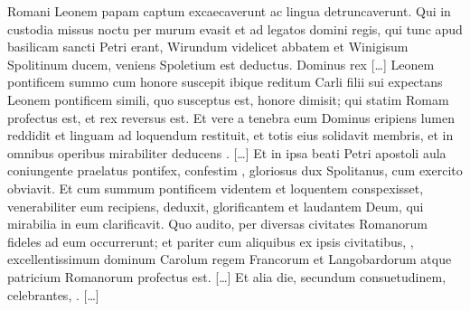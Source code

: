 \documentclass[12pt]{article}
\begin{document}
{		\beginnumbering
		\pstart
		 Romani Leonem papam  captum excaecaverunt ac lingua detruncaverunt. Qui in custodia missus noctu per murum evasit et ad legatos domini regis, qui tunc apud basilicam sancti Petri erant, Wirundum videlicet abbatem et Winigisum Spolitinum ducem, veniens Spoletium est deductus. Dominus rex [\dots]  Leonem pontificem summo cum honore suscepit ibique reditum Carli filii sui expectans Leonem pontificem simili, quo susceptus est, honore dimisit; qui statim Romam profectus est, et rex  reversus est.
		\pend
		\vskip 12pt
		\pstart
		 Et vere a tenebra eum Dominus eripiens lumen reddidit et linguam ad loquendum restituit, et totis eius solidavit membris, et in omnibus operibus mirabiliter deducens . [\dots] Et in ipsa beati Petri apostoli aula coniungente praelatus pontifex, confestim , gloriosus dux Spolitanus, cum  exercito obviavit. Et cum summum pontificem videntem et loquentem conspexisset, venerabiliter eum recipiens,  deduxit, glorificantem et laudantem Deum, qui  mirabilia in eum clarificavit. Quo audito, per diversas civitates Romanorum fideles ad eum occurrerunt; et pariter cum aliquibus ex ipsis civitatibus, ,  excellentissimum dominum Carolum regem Francorum et Langobardorum atque patricium Romanorum profectus est. [\dots]
		\pend
		\pstart
		Et alia die, secundum  consuetudinem,  celebrantes, . [\dots] 
}
\end{document}
